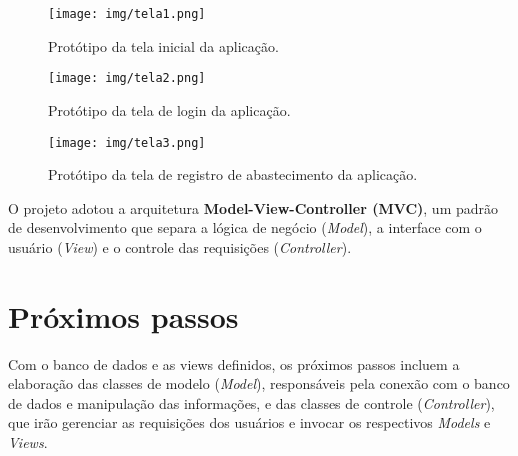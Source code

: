 \begin{figure}[htbp!]
    \centering
    \suppressfloats[t]
    \texttt{[image: img/tela1.png]}
    \caption{Protótipo da tela inicial da aplicação.}
    \label{fig:tela1}
\end{figure}

\begin{figure}[htbp!]
    \centering
    \suppressfloats[t]
    \texttt{[image: img/tela2.png]}
    \caption{Protótipo da tela de login da aplicação.}
    \label{fig:tela2}
\end{figure}

\begin{figure}[htbp!]
    \centering
    \suppressfloats[t]
    \texttt{[image: img/tela3.png]}
    \caption{Protótipo da tela de registro de abastecimento da aplicação.}
    \label{fig:tela3}
\end{figure}


O projeto adotou a arquitetura \textbf{Model-View-Controller (MVC)}, um padrão de desenvolvimento que separa a lógica de negócio (\textit{Model}), a interface com o usuário (\textit{View}) e o controle das requisições (\textit{Controller}). \cite{sommerville}

\section{Próximos passos}\label{sec:proxPassos}

Com o banco de dados e as views definidos, os próximos passos incluem a elaboração das classes de modelo (\textit{Model}), responsáveis pela conexão com o banco de dados e manipulação das informações, e das classes de controle (\textit{Controller}), que irão gerenciar as requisições dos usuários e invocar os respectivos \textit{Models} e \textit{Views}.